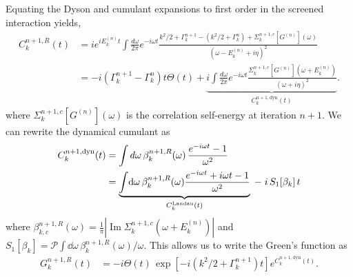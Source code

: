 Equating the Dyson and
cumulant expansions to first order in the screened interaction yields,
\begin{align}
C_k^{n+1,R}(t) &= i e^{iE_k^{(n)} t}\int \frac{d\omega}{2\pi} e^{-i\omega t}
\frac{k^2/2+\Gamma_k^{n+1}-\left(k^2/2 + \Gamma_k^{n}\right) +\Sigma_k^{n+1,c}[G^{(n)}](\omega) }{(\omega - E_k^{(n)} + i\eta)^2}\\
&= -i \left(\Gamma_k^{n+1}-\Gamma_k^{n}\right) t \Theta(t) + \underbrace{i
\int \frac{d\omega}{2\pi} e^{-i\omega t}
\frac{\Sigma_k^{n+1,c}[G^{(n)}](\omega + E_k^{(n)})}{(\omega + i\eta)^2}}_{C_k^{n+1,\text{dyn}}(t)}.
\end{align}
where $\Sigma_k^{n+1,c}[G^{(n)}](\omega)$ is the correlation self-energy at iteration $n+1$.
We can rewrite the dynamical cumulant as 
\begin{align}
C_k^{n+1,\text{dyn}}(t) &= \int d\omega\, \beta_{k}^{n+1,R}(\omega)\,
\frac{e^{-i\omega t}-1}{\omega^{2}}\\
&= \underbrace{\int\!\dd\omega\,\beta_{k}^{n+1,R}(\omega)
    \frac{e^{-i\omega t}+i\omega t-1}{\omega^2}}_{C^{\rm Landau}_k(t)}
  \;-\; i\,S_1[\beta_k]\,t
\end{align}
where $\beta_{k,c}^{n+1,R}(\omega)=\frac{1}{\pi}\left|\operatorname{Im}\Sigma_k^{n+1,c}
\!\left(\omega+E_k^{(n)}\right)\right|$ and $S_1[\beta_k]=\mathcal{P} \int\!\dd\omega\,\beta_{k}^{n+1,R}(\omega)/\omega$.
This allows us to write the Green's function as 
\begin{align}
G_k^{n+1,R}(t) &= - i\Theta(t)\, \exp\left[-i \left(k^2/2+\Gamma_k^{n+1}\right) t \right] e^{C_k^{n+1,\text{dyn}}(t)}.
\end{align}
